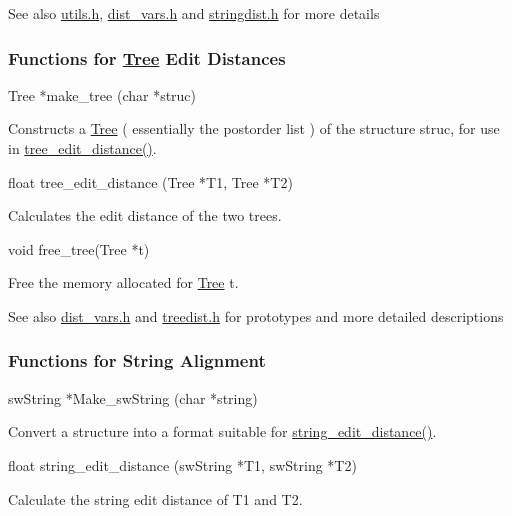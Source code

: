 \begin{DoxySeeAlso}{See also}
\hyperlink{utils_8h}{utils.\+h}, \hyperlink{dist__vars_8h}{dist\+\_\+vars.\+h} and \hyperlink{stringdist_8h}{stringdist.\+h} for more details
\end{DoxySeeAlso}
\subsubsection*{Functions for \hyperlink{structTree}{Tree} Edit Distances}

\begin{DoxyVerb}Tree   *make_tree (char *struc)
\end{DoxyVerb}
 Constructs a \hyperlink{structTree}{Tree} ( essentially the postorder list ) of the structure \textquotesingle{}struc\textquotesingle{}, for use in \hyperlink{treedist_8h_a3b21f1925f7071f46d93431a835217bb}{tree\+\_\+edit\+\_\+distance()}.

\begin{DoxyVerb}float   tree_edit_distance (Tree *T1,
                            Tree *T2) 
\end{DoxyVerb}
 Calculates the edit distance of the two trees.

\begin{DoxyVerb}void    free_tree(Tree *t)
\end{DoxyVerb}
 Free the memory allocated for \hyperlink{structTree}{Tree} t.

\begin{DoxySeeAlso}{See also}
\hyperlink{dist__vars_8h}{dist\+\_\+vars.\+h} and \hyperlink{treedist_8h}{treedist.\+h} for prototypes and more detailed descriptions
\end{DoxySeeAlso}
\subsubsection*{Functions for String Alignment}

\begin{DoxyVerb}swString *Make_swString (char *string)
\end{DoxyVerb}
 Convert a structure into a format suitable for \hyperlink{stringdist_8h_a89e3c335ef17780576d7c0e713830db9}{string\+\_\+edit\+\_\+distance()}.

\begin{DoxyVerb}float     string_edit_distance (swString *T1,
                                swString *T2)
\end{DoxyVerb}
 Calculate the string edit distance of T1 and T2.

